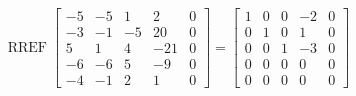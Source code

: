 \begin{exerciseAnswer} 


\[\operatorname{RREF} \left[\begin{array}{cccc|c}
-5 & -5 & 1 & 2 & 0 \\
-3 & -1 & -5 & 20 & 0 \\
5 & 1 & 4 & -21 & 0 \\
-6 & -6 & 5 & -9 & 0 \\
-4 & -1 & 2 & 1 & 0
\end{array}\right] = \left[\begin{array}{cccc|c}
1 & 0 & 0 & -2 & 0 \\
0 & 1 & 0 & 1 & 0 \\
0 & 0 & 1 & -3 & 0 \\
0 & 0 & 0 & 0 & 0 \\
0 & 0 & 0 & 0 & 0
\end{array}\right] \]



\end{exerciseAnswer}
